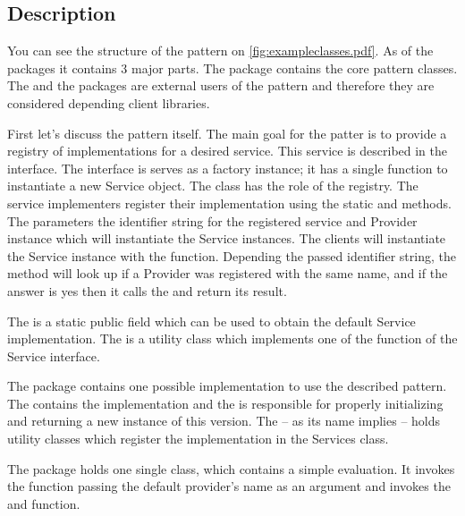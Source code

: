 \subsection{Description}


You can see the structure of the pattern on
\autoref{fig:exampleclasses.pdf}. As of the packages it contains 3 major parts.
The  package contains the core pattern classes. The 
and the  packages are external users of the pattern and therefore
they are considered depending client libraries.

First let's discuss the pattern itself. The main goal for the patter is to
provide a registry of implementations for a desired service. This service is
described in the  interface. The  interface is
serves as a factory instance; it has a single function to instantiate a new
Service object. The  class has the role of the registry.
The service implementers register their implementation using the static
 and  methods. The
parameters the identifier string for the registered service and Provider
instance which will instantiate the Service instances. The clients will
instantiate the Service instance with the  function.
Depending the passed identifier string, the method will look up if a Provider
was registered with the same name, and if the answer is yes then it calls the
 and return its result.

The  is a static public field which can be used to
obtain the default Service implementation. The  is a
utility class which implements one of the function of the Service interface.

The  package contains one possible implementation to use the
described pattern. The  contains the implementation and the
 is responsible for properly initializing and returning a
new instance of this version. The  -- as its name implies --
holds utility classes which register the implementation in the Services class.

The  package holds one single  class, which contains a
simple evaluation. It invokes the  function passing
the default provider's name as an argument and invokes the  and
 function.

